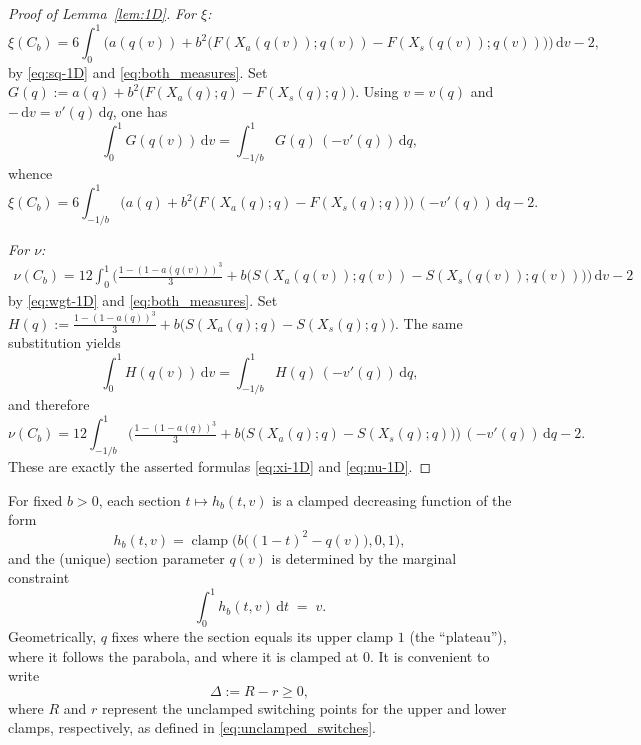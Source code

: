 \documentclass{article}
\DeclareMathOperator{\clamp}{clamp}
\newcommand{\1}{\mathds{1}}
\newcommand{\de}{\mathrm{\,d}}
\begin{document}
\begin{proof}[Proof of Lemma~\ref{lem:1D}]
\smallskip
\emph{For $\xi$:}
\[
\xi(C_b)
= 6\int_0^1\Big(a(q(v)) + b^2\big(F(X_a(q(v));q(v)) - F(X_s(q(v));q(v))\big)\Big)\de v - 2,
\]
by \eqref{eq:sq-1D} and \eqref{eq:both_measures}.
Set
\(
G(q):=a(q) + b^2\!\big(F(X_a(q);q) - F(X_s(q);q)\big).
\)
Using $v=v(q)$ and $-\de v=v'(q)\de q$, one has
\[
\int_0^1 G(q(v))\de v
= \int_{-1/b}^{1} G(q)\,(-v'(q))\de q,
\]
whence
\[
\xi(C_b)
= 6\!\!\int_{-1/b}^{1}\!\!\Big(a(q) + b^2\big(F(X_a(q);q) - F(X_s(q);q)\big)\Big)\,(-v'(q))\de q - 2.
\]

\smallskip
\emph{For $\nu$:}
\begin{align*}
\nu(C_b)
= 12\int_0^1\!\Big(\tfrac{1-(1-a(q(v)))^3}{3}
   + b\big(S(X_a(q(v));q(v)) - S(X_s(q(v));q(v))\big)\Big)\de v - 2
\end{align*}
by \eqref{eq:wgt-1D} and \eqref{eq:both_measures}. Set
\(
H(q):=\tfrac{1-(1-a(q))^3}{3} + b\big(S(X_a(q);q) - S(X_s(q);q)\big).
\)
The same substitution yields
\[
\int_0^1 H(q(v))\de v
= \int_{-1/b}^{1} H(q)\,(-v'(q))\de q,
\]
and therefore
\[
\nu(C_b)
= 12\!\!\int_{-1/b}^{1}\!\!\Big(\tfrac{1-(1-a(q))^3}{3}
   + b\big(S(X_a(q);q) - S(X_s(q);q)\big)\Big)\,(-v'(q))\de q - 2.
\]
These are exactly the asserted formulas \eqref{eq:xi-1D} and \eqref{eq:nu-1D}.
\end{proof}

For fixed \(b>0\), each section \(t\mapsto h_b(t,v)\) is a clamped decreasing function of the form
\begin{equation}\label{eq:section_appendix}
h_b(t,v)=\clamp\!\Big(b\big((1-t)^2-q(v)\big),0,1\Big),
\end{equation}
and the (unique) section parameter \(q(v)\) is determined by the marginal constraint
\[
\int_0^1 h_b(t,v)\de t \;=\; v.
\]
Geometrically, \(q\) fixes where the section equals its upper clamp \(1\) (the ``plateau''), where it follows the parabola, and where it is clamped at \(0\).
It is convenient to write
\begin{equation}\label{eq:RrDelta}
\Delta:=R-r\ge 0,
\end{equation}
where \(R\) and \(r\) represent the unclamped switching points for the upper and lower clamps, respectively, as defined in \eqref{eq:unclamped_switches}.
\end{document}
